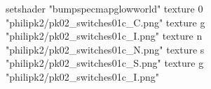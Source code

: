 setshader "bumpspecmapglowworld"
    texture 0 "philipk2/pk02_switches01c_C.png"
    texture g "philipk2/pk02_switches01c_I.png"
    texture n "philipk2/pk02_switches01c_N.png"
    texture s "philipk2/pk02_switches01c_S.png"
    texture g "philipk2/pk02_switches01c_I.png"